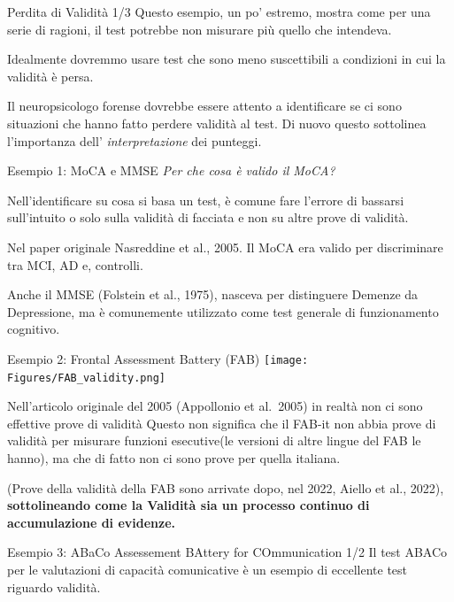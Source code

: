 \documentclass[
  ignorenonframetext,
]{beamer}
\begin{document}
\begin{frame}{Perdita di Validità 1/3}
\label{perdita-di-validituxe0-13-1}
Questo esempio, un po' estremo, mostra come per una serie di ragioni, il
test potrebbe non misurare più quello che intendeva.

Idealmente dovremmo usare test che sono meno suscettibili a condizioni
in cui la validità è persa.

Il neuropsicologo forense dovrebbe essere attento a identificare se ci
sono situazioni che hanno fatto perdere validità al test. Di nuovo
questo sottolinea l'importanza dell' \emph{interpretazione} dei
punteggi.
\end{frame}

\begin{frame}{Esempio 1: MoCA e MMSE}
\label{esempio-1-moca-e-mmse}
\emph{Per che cosa è valido il MoCA?}

\hfill\break
Nell'identificare su cosa si basa un test, è comune fare l'errore di
bassarsi sull'intuito o solo sulla validità di facciata e non su altre
prove di validità.

\pause

Nel paper originale Nasreddine et al., 2005. Il MoCA era valido per
discriminare tra MCI, AD e, controlli.

Anche il MMSE (Folstein et al., 1975), nasceva per distinguere Demenze
da Depressione, ma è comunemente utilizzato come test generale di
funzionamento cognitivo.
\end{frame}

\begin{frame}{Esempio 2: Frontal Assessment Battery (FAB)}
\label{esempio-2-frontal-assessment-battery-fab}
\texttt{[image: Figures/FAB\_validity.png]}

Nell'articolo originale del 2005 (Appollonio et al.~2005) in realtà non
ci sono effettive prove di validità Questo non significa che il FAB-it
non abbia prove di validità per misurare funzioni esecutive(le versioni
di altre lingue del FAB le hanno), ma che di fatto non ci sono prove per
quella italiana.

(Prove della validità della FAB sono arrivate dopo, nel 2022, Aiello et
al., 2022), \textbf{sottolineando come la Validità sia un processo
continuo di accumulazione di evidenze.}
\end{frame}

\begin{frame}{Esempio 3:
{\small ABaCo Assessement BAttery for COmmunication} 1/2}
\label{esempio-3-12}
Il test ABACo per le valutazioni di capacità comunicative è un esempio
di eccellente test riguardo validità.
\end{frame}
\end{document}

